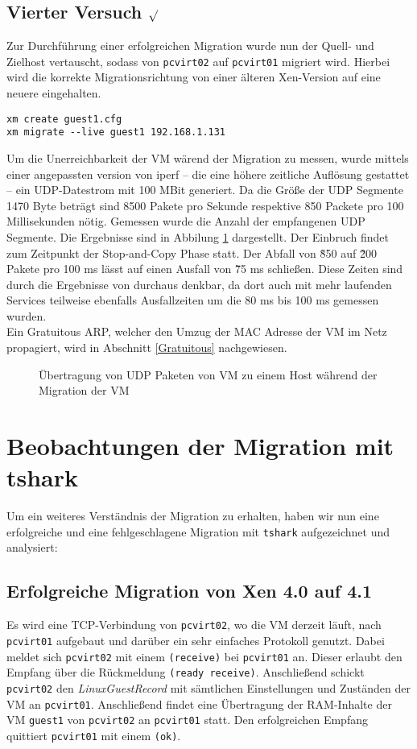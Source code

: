 \subsection {Vierter Versuch $\surd$ }
Zur Durchführung einer erfolgreichen Migration wurde nun der Quell- und Zielhost vertauscht, sodass von \verb#pcvirt02# auf \verb#pcvirt01# migriert wird. Hierbei wird die korrekte Migrationsrichtung von einer älteren Xen-Version auf eine neuere eingehalten.
\setupVerbatimOut
\begin{verbatim} 
xm create guest1.cfg
xm migrate --live guest1 192.168.1.131
\end{verbatim}

Um die Unerreichbarkeit der VM wärend der Migration zu messen, wurde mittels einer angepassten version von iperf -- die eine höhere zeitliche Auflösung gestattet -- ein UDP-Datestrom mit 100 MBit generiert. Da die Größe der UDP Segmente 1470 Byte beträgt sind 8500 Pakete pro Sekunde respektive 850 Packete pro 100 Millisekunden nötig. Gemessen wurde die Anzahl der empfangenen UDP Segmente. Die Ergebnisse sind in Abbilung \ref{migration_plot} dargestellt. Der Einbruch findet zum Zeitpunkt der Stop-and-Copy Phase statt. Der Abfall von \~850 auf \~200 Pakete pro 100 ms lässt auf einen Ausfall von \~75 ms schließen. Diese Zeiten sind durch die Ergebnisse von \cite{clark2005live} durchaus denkbar, da dort auch mit mehr laufenden Services teilweise ebenfalls Ausfallzeiten um die 80 ms bis 100 ms gemessen wurden.
\\
Ein Gratuitous ARP, welcher den Umzug der MAC Adresse der VM im Netz propagiert, wird in Abschnitt \ref{Gratuitous} nachgewiesen.

\begin{figure}

\caption{Übertragung von UDP Paketen von VM zu einem Host während der Migration der VM}
\label{migration_plot}
\end{figure}

\section{Beobachtungen der Migration mit tshark} \label{mig_tcpdump}
Um ein weiteres Verständnis der Migration zu erhalten, haben wir nun eine erfolgreiche und eine fehlgeschlagene Migration mit \verb#tshark# aufgezeichnet und analysiert:

\subsection{Erfolgreiche Migration von Xen 4.0 auf 4.1}
Es wird eine TCP-Verbindung von \verb#pcvirt02#, wo die VM derzeit läuft, nach \verb#pcvirt01# aufgebaut und darüber ein sehr einfaches Protokoll genutzt. Dabei meldet sich \verb#pcvirt02# mit einem \verb|(receive)| bei \verb#pcvirt01# an. Dieser erlaubt den Empfang über die Rückmeldung \verb|(ready receive)|. Anschließend schickt \verb#pcvirt02# den \emph{LinuxGuestRecord} mit sämtlichen Einstellungen und Zuständen der VM an \verb#pcvirt01#. Anschließend findet eine Übertragung der RAM-Inhalte der VM \verb#guest1# von \verb#pcvirt02#  an \verb#pcvirt01# statt. Den erfolgreichen Empfang quittiert \verb#pcvirt01# mit einem \verb|(ok)|.

